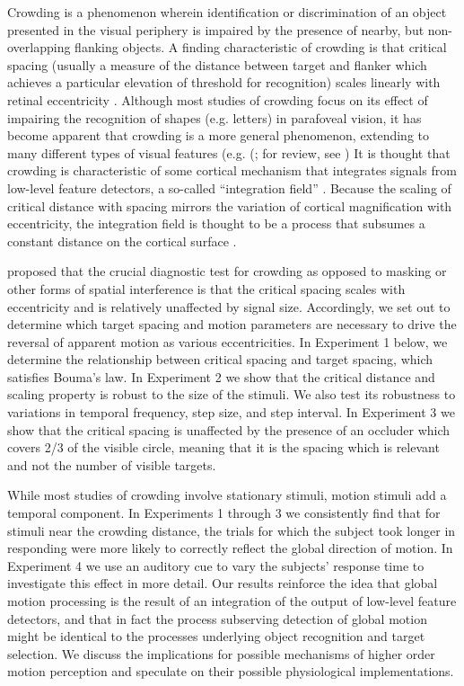 \documentclass[manuscript]{subfiles}
\begin{document}
Crowding is a phenomenon wherein identification or discrimination of an object presented in the visual periphery is impaired by the presence of nearby, but non-overlapping flanking objects. A finding characteristic of crowding is that critical spacing (usually a measure of the distance between target and flanker which achieves a particular elevation of threshold for recognition) scales linearly with retinal eccentricity \citep{Bouma:1970ng,Toet:1992db}. Although most studies of crowding focus on its effect of impairing the recognition of shapes (e.g. letters) in parafoveal vision, it has become apparent that crowding is a more general phenomenon, extending to many different types of visual features (e.g. (\citealt{Berg:2007rc}; for review, see \citealt{Levi:2008la}) It is thought that crowding is characteristic of some cortical mechanism that integrates signals from low-level feature detectors, a so-called ``integration field'' \citep{Pelli:2004km}. Because the scaling of critical distance with spacing mirrors the variation of cortical magnification with eccentricity, the integration field is thought to be a process that subsumes a constant distance on the cortical surface \citep{Pelli:2008nx}.


\citet{Pelli:2004km} proposed that the crucial diagnostic test for crowding as opposed to masking or other forms of spatial interference is that the critical spacing scales with eccentricity and is relatively unaffected by signal size. Accordingly, we set out to determine which target spacing and motion parameters are necessary to drive the reversal of apparent motion as various eccentricities. In Experiment 1 below, we determine the relationship between critical spacing and target spacing, which satisfies Bouma's law. In Experiment 2 we show that the critical distance and scaling property is robust to the size of the stimuli. We also test its robustness to variations in temporal frequency, step size, and step interval. In Experiment 3 we show that the critical spacing is unaffected by the presence of an occluder which covers 2/3 of the visible circle, meaning that it is the spacing which is relevant and not the number of visible targets.

While most studies of crowding involve stationary stimuli, motion stimuli add a temporal component. In Experiments 1 through 3 we consistently find that for stimuli near the crowding distance, the trials for which the subject took longer in responding were more likely to correctly reflect the global direction of motion. In Experiment 4 we use an auditory cue to vary the subjects' response time to investigate this effect in more detail. Our results reinforce the idea that global motion processing is the result of an integration of the output of low-level feature detectors, and that in fact the process subserving detection of global motion might be identical to the processes underlying object recognition and target selection. We discuss the implications for possible mechanisms of higher order motion perception and speculate on their possible physiological implementations.

\biblio
\end{document}
